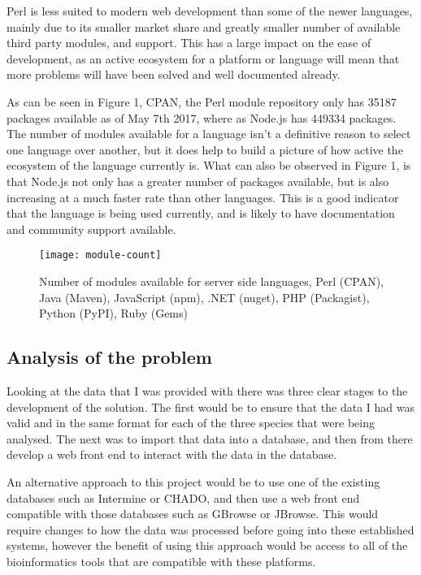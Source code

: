 Perl is less suited to modern web development than some of the newer languages, mainly due to its smaller market share\cite{perl-market} and greatly smaller number of available third party modules, and support. This has a large impact on the ease of development, as an active ecosystem for a platform or language will mean that more problems will have been solved and well documented already.

As can be seen in Figure 1, CPAN, the Perl module repository only has 35187 packages available as of May 7th 2017, where as Node.js has 449334 packages. The number of modules available for a language isn't a definitive reason to select one language over another, but it does help to build a picture of how active the ecosystem of the language currently is. What can also be observed in Figure 1, is that Node.js not only has a greater number of packages available, but is also increasing at a much faster rate than other languages. This is a good indicator that the language is being used currently, and is likely to have documentation and community support available.

\begin{figure}[ht!]
\begin{center}
\texttt{[image: module-count]}
\caption{Number of modules available for server side languages, Perl (CPAN), Java (Maven), JavaScript (npm), .NET (nuget), PHP (Packagist), Python (PyPI), Ruby (Gems)\cite{modulecounts}}
\end{center}
\end{figure}

\subsection{Analysis of the problem}
Looking at the data that I was provided with there was three clear stages to the development of the solution. The first would be to ensure that the data I had was valid and in the same format for each of the three species that were being analysed. The next was to import that data into a database, and then from there develop a web front end to interact with the data in the database. 

An alternative approach to this project would be to use one of the existing databases such as Intermine\cite{intermine} or CHADO\cite{chado}, and then use a web front end compatible with those databases such as GBrowse\cite{gbrowse} or JBrowse\cite{jbrowse}. This would require changes to how the data was processed before going into these established systems, however the benefit of using this approach would be access to all of the bioinformatics tools that are compatible with these platforms.


